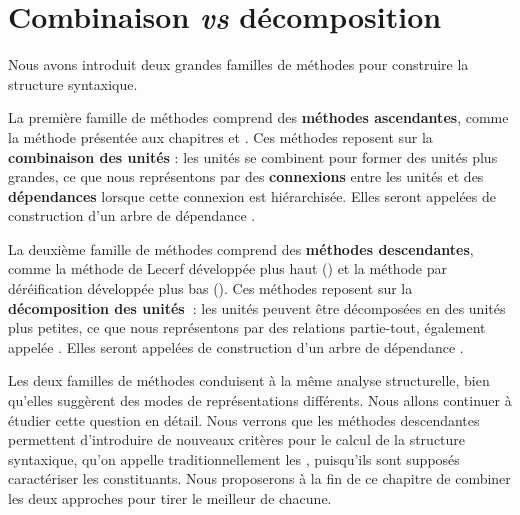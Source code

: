 \section{Combinaison \textit{vs} décomposition}\label{sec:3.4.8}

Nous avons introduit deux grandes familles de méthodes pour construire la structure syntaxique.

La première famille de méthodes comprend des \textbf{méthodes ascendantes}, comme la méthode présentée aux chapitres  et . Ces méthodes reposent sur la \textbf{combinaison des unités} : les unités se combinent pour former des unités plus grandes, ce que nous représentons par des \textbf{connexions} entre les unités et des \textbf{dépendances} lorsque cette connexion est hiérarchisée. Elles seront appelées  de construction d’un arbre de dépendance .

La deuxième famille de méthodes comprend des \textbf{méthodes descendantes}, com\-me la méthode de Lecerf développée plus haut () et la méthode par déréification développée plus bas (). Ces méthodes reposent sur la \textbf{décomposition des unités~}: les unités peuvent être décomposées en des unités plus petites, ce que nous représentons par des relations partie-tout, également appelée . Elles seront appelées  de construction d’un arbre de dépendance .

Les deux familles de méthodes conduisent à la même analyse structurelle, bien qu’elles suggèrent des modes de représentations différents. Nous allons continuer à étudier cette question en détail. Nous verrons que les méthodes descendantes permettent d’introduire de nouveaux critères pour le calcul de la structure syntaxique, qu’on appelle traditionnellement les , puisqu’ils sont supposés caractériser les constituants. Nous proposerons à la fin de ce chapitre de combiner les deux approches pour tirer le meilleur de chacune.

